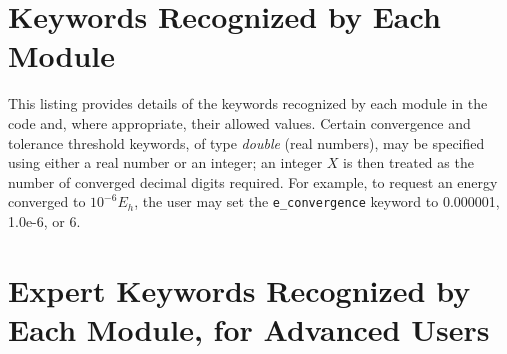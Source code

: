 \section{Keywords Recognized by Each Module}\label{keywords}
This listing provides details of the keywords recognized by each module in the
code and, where appropriate, their allowed values.  Certain convergence and tolerance
threshold keywords, of type {\it double} (real numbers), may be specified using
either a real number or an integer; an integer $X$ is then treated as the
number of converged decimal digits required.  For example, to request an energy
converged to $10^{-6} E_h$, the user may set the {\tt e\_convergence} keyword
to 0.000001, 1.0e-6, or 6.

\section{Expert Keywords Recognized by Each Module, for Advanced Users}\label{expertkeywords}

